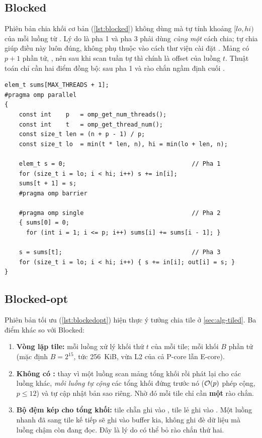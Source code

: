 \subsection{Blocked}

Phiên bản chia khối cơ bản (\cref{lst:blocked}) không dùng  mà tự tính khoảng
\([lo, hi)\) của mỗi luồng từ . Lý do là pha 1 và pha 3 phải dùng
\emph{cùng một} cách chia; tự chia giúp điều này luôn đúng, không phụ thuộc vào cách thư viện cài
đặt . Mảng  có \(p + 1\) phần tử, , nên sau khi
scan tuần tự thì  chính là offset của luồng \(t\). Thuật toán chỉ cần hai điểm đồng
bộ:  sau pha 1 và rào chắn ngầm định cuối .

\begin{lstlisting}[caption={Blocked: ba pha, mỗi luồng một khối liên tiếp.},label={lst:blocked}]
elem_t sums[MAX_THREADS + 1];
#pragma omp parallel
{
    const int    p   = omp_get_num_threads();
    const int    t   = omp_get_thread_num();
    const size_t len = (n + p - 1) / p;
    const size_t lo  = min(t * len, n), hi = min(lo + len, n);

    elem_t s = 0;                                   // Pha 1
    for (size_t i = lo; i < hi; i++) s += in[i];
    sums[t + 1] = s;
    #pragma omp barrier

    #pragma omp single                              // Pha 2
    { sums[0] = 0;
      for (int i = 1; i <= p; i++) sums[i] += sums[i - 1]; }

    s = sums[t];                                    // Pha 3
    for (size_t i = lo; i < hi; i++) { s += in[i]; out[i] = s; }
}
\end{lstlisting}

\subsection{Blocked-opt}

Phiên bản tối ưu (\cref{lst:blockedopt}) hiện thực ý tưởng chia tile ở \cref{sec:alg-tiled}.
Ba điểm khác so với Blocked:
\begin{enumerate}
  \item \textbf{Vòng lặp tile:} mỗi luồng xử lý khối thứ \(t\) của mỗi tile; mỗi khối \(B\)
        phần tử (mặc định \(B = 2^{15}\), tức 256~KiB, vừa L2 của cả P-core lẫn E-core).
  \item \textbf{Không có :} thay vì một luồng scan mảng tổng khối rồi phát lại cho
        các luồng khác, \emph{mỗi luồng tự cộng} các tổng khối đứng trước nó (\(\mathcal{O}(p)\) phép
        cộng, \(p \le 12\)) và tự cập nhật bản sao  riêng. Nhờ đó mỗi tile chỉ cần
        \textbf{một} rào chắn.
  \item \textbf{Bộ đệm kép cho tổng khối:} tile chẵn ghi vào , tile lẻ ghi vào
        . Một luồng nhanh đã sang tile kế tiếp sẽ ghi vào buffer kia, không ghi đè
        dữ liệu mà luồng chậm còn đang đọc. Đây là lý do có thể bỏ rào chắn thứ hai.
\end{enumerate}

